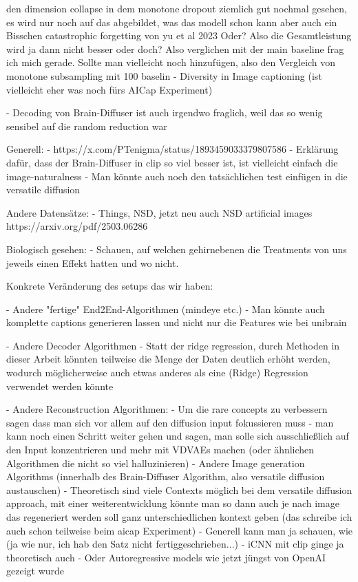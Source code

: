den dimension collapse in dem monotone dropout ziemlich gut nochmal gesehen, es wird nur noch auf das abgebildet, was das modell schon kann
aber auch ein Bisschen catastrophic forgetting von yu et al 2023
Oder?
Also die Gesamtleistung wird ja dann nicht besser oder doch?
Also verglichen mit der main baseline frag ich mich gerade.
Sollte man vielleicht noch hinzufügen, also den Vergleich von monotone subsampling mit 100 baselin
\cite{wangDiversityImageCaptioning2022}
- Diversity in Image captioning (ist vielleicht eher was noch fürs AICap Experiment)

- Decoding von Brain-Diffuser ist auch irgendwo fraglich, weil das so wenig sensibel auf die random reduction war

Generell:
- https://x.com/PTenigma/status/1893459033379807586
- Erklärung dafür, dass der Brain-Diffuser in clip so viel besser ist, ist vielleicht einfach die image-naturalness
- Man könnte auch noch den tatsächlichen test einfügen in die versatile diffusion

Andere Datensätze:
- Things, NSD, jetzt neu auch NSD artificial images 
https://arxiv.org/pdf/2503.06286

Biologisch gesehen:
- Schauen, auf welchen gehirnebenen die Treatments von uns jeweils einen Effekt hatten und wo nicht.

Konkrete Veränderung des setups das wir haben:

- Andere "fertige" End2End-Algorithmen (mindeye etc.)
    - Man könnte auch komplette captions generieren lassen und nicht nur die Features wie bei unibrain \cite{maiUniBrainUnifyImage2023}

- Andere Decoder Algorithmen 
    - Statt der ridge regression, durch Methoden in dieser Arbeit könnten teilweise die Menge der Daten deutlich erhöht werden, wodurch möglicherweise auch etwas anderes als eine (Ridge) Regression verwendet werden könnte

- Andere Reconstruction Algorithmen:
    - Um die rare concepts zu verbessern sagen \cite{samuelGeneratingImagesRare2024} dass man sich vor allem auf den diffusion input fokussieren muss
        - man kann noch einen Schritt weiter gehen und sagen, man solle sich ausschließlich auf den Input konzentrieren und mehr mit VDVAEs machen (oder ähnlichen Algorithmen die nicht so viel halluzinieren)
    - Andere Image generation Algorithms (innerhalb des Brain-Diffuser Algorithm, also versatile diffusion austauschen)
    - Theoretisch sind viele Contexts möglich bei dem versatile diffusion approach, mit einer weiterentwicklung könnte man so dann auch je nach image das regeneriert werden soll ganz unterschiedlichen kontext geben (das schreibe ich auch schon teilweise beim aicap Experiment)
    - Generell kann man ja schauen, wie (ja wie nur, ich hab den Satz nicht fertiggeschrieben...)
    - iCNN mit clip ginge ja theoretisch auch
    - Oder Autoregressive models wie jetzt jüngst von OpenAI gezeigt wurde


